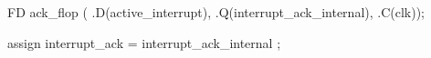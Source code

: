\begin{vcode}
FD ack_flop ( 
    .D(active_interrupt),
    .Q(interrupt_ack_internal),
    .C(clk));

assign interrupt_ack = interrupt_ack_internal ;
\end{vcode}

